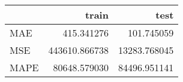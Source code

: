 \begin{tabular}{lrr}
\toprule
{} &          train &          test \\
\midrule
MAE  &     415.341276 &    101.745059 \\
MSE  &  443610.866738 &  13283.768045 \\
MAPE &   80648.579030 &  84496.951141 \\
\bottomrule
\end{tabular}
